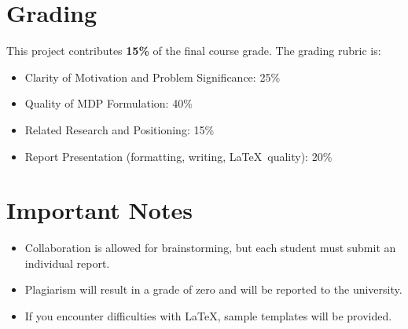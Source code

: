 \documentclass[12pt]{article}
\begin{document}
\section{Grading}
This project contributes \textbf{15\%} of the final course grade. The grading rubric is:
\begin{itemize}[leftmargin=*]
    \item Clarity of Motivation and Problem Significance: 25\%
    \item Quality of MDP Formulation: 40\%
    \item Related Research and Positioning: 15\%
    \item Report Presentation (formatting, writing, \LaTeX\ quality): 20\%
\end{itemize}

\section{Important Notes}
\begin{itemize}[leftmargin=*]
    \item Collaboration is allowed for brainstorming, but each student must submit an individual report.
    \item Plagiarism will result in a grade of zero and will be reported to the university.
    \item If you encounter difficulties with \LaTeX, sample templates will be provided.
\end{itemize}
\end{document}
